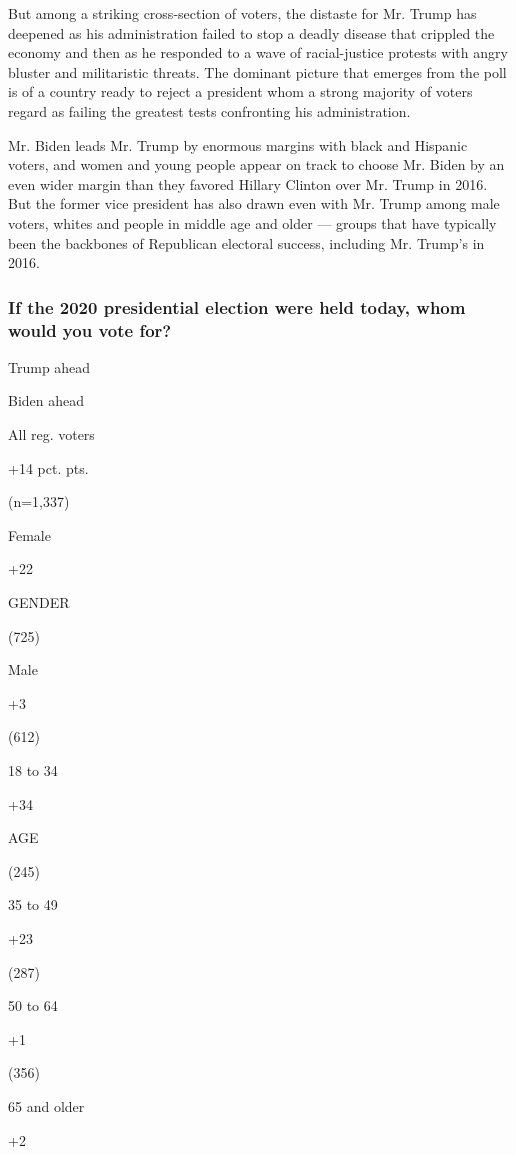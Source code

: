 But among a striking cross-section of voters, the distaste for Mr. Trump
has deepened as his administration failed to stop a deadly disease that
crippled the economy and then as he responded to a wave of
racial-justice protests with angry bluster and militaristic threats. The
dominant picture that emerges from the poll is of a country ready to
reject a president whom a strong majority of voters regard as failing
the greatest tests confronting his administration.

Mr. Biden leads Mr. Trump by enormous margins with black and Hispanic
voters, and women and young people appear on track to choose Mr. Biden
by an even wider margin than they favored Hillary Clinton over Mr. Trump
in 2016. But the former vice president has also drawn even with Mr.
Trump among male voters, whites and people in middle age and older ---
groups that have typically been the backbones of Republican electoral
success, including Mr. Trump's in 2016.

\hypertarget{if-the-2020-presidential-election-were-held-today-whom-would-you-vote-for}{%
\subsubsection{If the 2020 presidential election were held today, whom
would you vote
for?}\label{if-the-2020-presidential-election-were-held-today-whom-would-you-vote-for}}

Trump ahead

Biden ahead

All reg. voters

+14 pct. pts.

(n=1,337)

Female

+22

GENDER

(725)

Male

+3

(612)

18 to 34

+34

AGE

(245)

35 to 49

+23

(287)

50 to 64

+1

(356)

65 and older

+2

